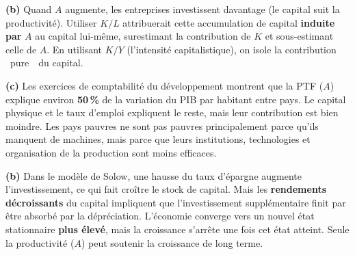 \begin{reponse}
\textbf{(b)} Quand $A$ augmente, les entreprises investissent davantage (le capital suit la productivité). Utiliser $K/L$ attribuerait cette accumulation de capital \textbf{induite par} $A$ au capital lui-même, surestimant la contribution de $K$ et sous-estimant celle de $A$. En utilisant $K/Y$ (l'intensité capitalistique), on isole la contribution \guillemotleft~pure~\guillemotright\ du capital.
\end{reponse}


\begin{reponse}
\textbf{(c)} Les exercices de comptabilité du développement montrent que la PTF ($A$) explique environ \textbf{50\,\%} de la variation du PIB par habitant entre pays. Le capital physique et le taux d'emploi expliquent le reste, mais leur contribution est bien moindre. Les pays pauvres ne sont pas pauvres principalement parce qu'ils manquent de machines, mais parce que leurs institutions, technologies et organisation de la production sont moins efficaces.
\end{reponse}


\begin{reponse}
\textbf{(b)} Dans le modèle de Solow, une hausse du taux d'épargne augmente l'investissement, ce qui fait croître le stock de capital. Mais les \textbf{rendements décroissants} du capital impliquent que l'investissement supplémentaire finit par être absorbé par la dépréciation. L'économie converge vers un nouvel état stationnaire \textbf{plus élevé}, mais la croissance s'arrête une fois cet état atteint. Seule la productivité ($A$) peut soutenir la croissance de long terme.
\end{reponse}

